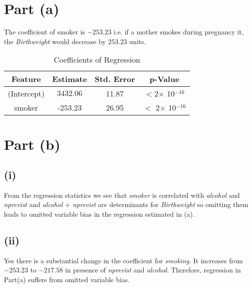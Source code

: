 \documentclass{./solution}
\begin{document}
    \begin{solution}
        \section*{Part (a)}
            The coefficient of smoker is $-253.23$ i.e. if a mother smokes during
            pregnancy it, the \textit{Birthweight} would decrease by $253.23$ units.


            \begin{table}[H]
                \caption{Coefficients of Regression}
                \begin{tabularx}{\textwidth}{C C C C}
                    \toprule
                    Feature & Estimate & Std. Error & p-Value \\
                    \midrule
                    (Intercept) & $3432.06$ &  11.87 & $<$2$\times$ 10$^{-16}$ \\
                    smoker         &  -253.23 & 26.95 &  $<$ 2$\times$ 10$^{-16}$ \\

                    \bottomrule
                \end{tabularx}
            \end{table}
            \vspace{-5mm}

        \section*{Part (b)}
            \subsection*{  (i)}
            From the regression statistics we see that \textit{smoker} is correlated with \textit{alcohol} and \textit{nprevist} and \textit{alcohol} + \textit{nprevist} are determinants for \textit{Birthweight} so omitting
            them leads to  omitted variable bias in the regression estimated in (a).

            \subsection*{ (ii)}
            Yes there is a substantial change in the coefficient for \textit{smoking}.
            It increases from $-253.23$ to $-217.58$ in presence of \textit{nprevist} and \textit{alcohol}. Therefore, regression in Part(a)
            suffers from omitted variable bias.


\end{solution}
\end{document}
